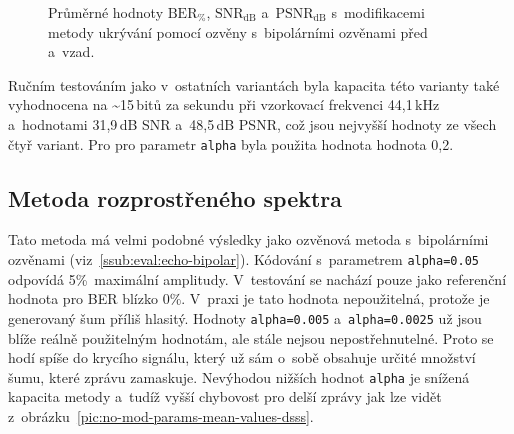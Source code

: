 \begin{figure}[H]
    \table
    \centering
    \caption{Průměrné hodnoty $\mathrm{BER}_{\%}$, $\mathrm{SNR}_\mathrm{dB}$
    a~$\mathrm{PSNR}_\mathrm{dB}$ s~modifikacemi metody ukrývání pomocí
    ozvěny s~bipolárními ozvěnami před a~vzad.}
    \label{pic:modifications-mean-values-echo-bipolar-bf}
\end{figure}

Ručním testováním jako v~ostatních variantách byla kapacita této varianty také
vyhodnocena na \textasciitilde15\,bitů za sekundu při vzorkovací frekvenci
44,1\,kHz a~hodnotami 31,9\,dB SNR a~48,5\,dB PSNR, což jsou nejvyšší hodnoty
ze všech čtyř variant. Pro pro parametr \texttt{alpha} byla použita hodnota
hodnota 0,2.

\subsection*{Metoda rozprostřeného spektra}

Tato metoda má velmi podobné výsledky jako ozvěnová metoda s~bipolárními
ozvěnami (viz~\ref{ssub:eval:echo-bipolar}). Kódování s~parametrem
\texttt{alpha=0.05} odpovídá 5\%~maximální amplitudy. V~testování se nachází
pouze jako referenční hodnota pro BER blízko 0\%. V~praxi je tato hodnota
nepoužitelná, protože je generovaný šum příliš hlasitý. Hodnoty
\texttt{alpha=0.005} a~\texttt{alpha=0.0025} už jsou blíže reálně použitelným
hodnotám, ale stále nejsou nepostřehnutelné. Proto se hodí spíše do krycího
signálu, který už sám o~sobě obsahuje určité množství šumu, které zprávu
zamaskuje. Nevýhodou nižších hodnot \texttt{alpha} je snížená kapacita metody
a~tudíž vyšší chybovost pro delší zprávy jak lze vidět
z~obrázku~\ref{pic:no-mod-params-mean-values-dsss}.

